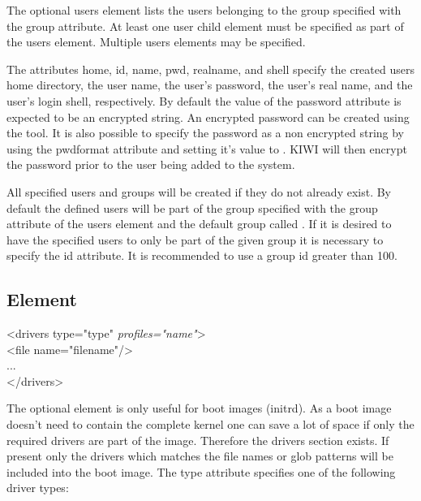 The optional users element lists the users belonging to the group specified
with the group attribute. At least one user child element must be specified
as part of the users element. Multiple users elements may be specified.

The attributes home, id, name, pwd, realname, and shell specify the created
users home directory, the user name, the user's password, the user's 
real name, and the user's login shell, respectively. By default the value
of the password attribute is expected to be an encrypted string. An
encrypted password can be created using the  tool. It
is also possible to specify the password as a non encrypted string by using
the pwdformat attribute and setting it's value to . KIWI will then
encrypt the password prior to the user being added to the system.

All specified users and groups will be created if they do not already exist.
By default the defined users will be part of the group specified with the 
group attribute of the users element and the default group called .
If it is desired to have the specified users to only be part of the given
group it is necessary to specify the id attribute. It is recommended to use
a group id greater than 100.

\subsection{ Element}
\begin{Command}{12cm}
<drivers type="type" \textit{profiles="name"}>\\
\hspace*{1cm}<file name="filename"/>\\
\hspace*{1cm}...\\
</drivers>
\end{Command}

The optional  element is only useful for boot images (initrd).
As a boot image doesn't need to contain the complete kernel one can
save a lot of space if only the required drivers are part of the image.
Therefore the drivers section exists. If present only the drivers which
matches the file names or glob patterns will be included into the
boot image. The type attribute specifies one of the following driver
types:

